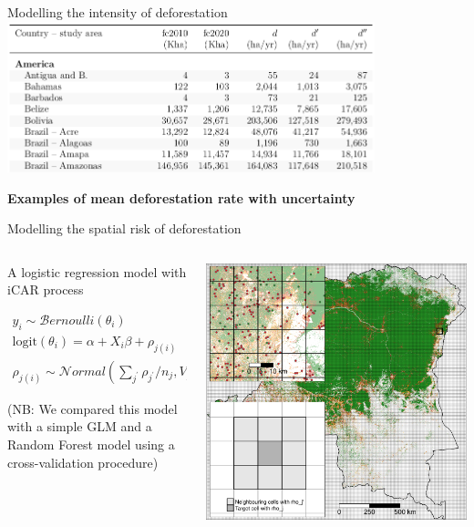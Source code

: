 \documentclass[10pt,table,dvipsnames,compress]{beamer}
\begin{document}
\begin{frame}[label={sec:org22b437c}]{Modelling the intensity of deforestation}
\centering \includegraphics[width=0.8\textwidth]{figs/d_ci}

\textbf{Examples of mean deforestation rate with uncertainty}
\end{frame}

\begin{frame}[label={sec:orgda4c3f3}]{Modelling the spatial risk of deforestation}
\begin{columns}
\begin{column}{0.5\columnwidth}
A logistic regression model with iCAR process

\begin{equation*}
\begin{split}
  y_i \sim \mathcal{B}ernoulli(\theta_i)\\
  \text{logit}(\theta_i) = \alpha + X_i \beta + \rho_{j(i)}\\
  \rho_{j(i)} \sim \mathcal{N}ormal(\sum_{j^{\prime}} \rho_{j^{\prime}} / n_j,V_{\rho} / n_j)
\end{split}
\end{equation*}

\footnotesize (NB: We compared this model with a simple GLM and a Random
Forest model using a cross-validation procedure)
\end{column}

\begin{column}{0.5\columnwidth}
\includegraphics[width=\textwidth]{figs/sm/grid}


\end{column}
\end{columns}
\end{frame}
\end{document}
